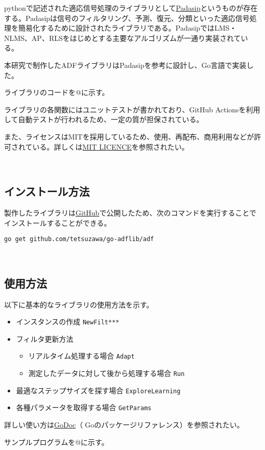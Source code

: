 pythonで記述された適応信号処理のライブラリとして\href{https://matousc89.github.io/padasip/index.html\#padasip}{Padasip}というものが存在する。Padasipは信号のフィルタリング、予測、復元、分類といった適応信号処理を簡易化するために設計されたライブラリである。PadasipではLMS・NLMS、AP、RLSをはじめとする主要なアルゴリズムが一通り実装されている。

本研究で制作したADFライブラリはPadasipを参考に設計し、Go言語で実装した。

ライブラリのコードを@に示す。

ライブラリの各関数にはユニットテストが書かれており、GitHub
Actionsを利用して自動テストが行われるため、一定の質が担保されている。

また、ライセンスはMITを採用しているため、使用、再配布、商用利用などが許可されている。詳しくは\href{https://raw.githubusercontent.com/tetsuzawa/go-adflib/master/LICENSE}{MIT
LICENCE}を参照されたい。

\
\subsection{インストール方法}\label{ux30a4ux30f3ux30b9ux30c8ux30fcux30ebux65b9ux6cd5}

製作したライブラリは\href{https://github.com/tetsuzawa/go-adflib}{GitHub}で公開したため、次のコマンドを実行することでインストールすることができる。

\texttt{go\ get\ github.com/tetsuzawa/go-adflib/adf}

\
\subsection{使用方法}\label{ux4f7fux7528ux65b9ux6cd5}

以下に基本的なライブラリの使用方法を示す。

\begin{itemize}
\tightlist
\item
  インスタンスの作成 \texttt{NewFilt***}
\item
  フィルタ更新方法

  \begin{itemize}
  \tightlist
  \item
    リアルタイム処理する場合 \texttt{Adapt}
  \item
    測定したデータに対して後から処理する場合 \texttt{Run}
  \end{itemize}
\item
  最適なステップサイズを探す場合 \texttt{ExploreLearning}
\item
  各種パラメータを取得する場合 \texttt{GetParams}
\end{itemize}

詳しい使い方は\href{https://godoc.org/github.com/tetsuzawa/go-adflib}{GoDoc}（Goのパッケージリファレンス）を参照されたい。

サンプルプログラムを@に示す。
